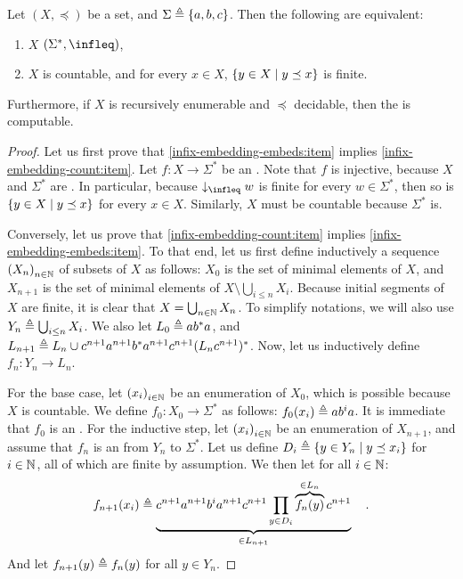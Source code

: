 \begin{theorem}
    \label{infix-embedding:thm}
    Let $(X, \preceq)$ be a  set,
    and $\Sigma \triangleq \{ a,b,c \}$.
    Then the following are equivalent:
    \begin{enumerate}
        \item \label{infix-embedding-embeds:item} 
            $X$  $(\Sigma^*, \infleq)$,
        \item \label{infix-embedding-count:item}
            $X$ is countable, and for every $x \in X$,
        $\{ y \in X \mid y \preceq x \}$ is finite.
    \end{enumerate}
    Furthermore, if $X$ is recursively enumerable and $\preceq$ decidable,
    then
    the  is computable.
\end{theorem}
\begin{proof}
    Let us first prove that \cref{infix-embedding-embeds:item} implies
    \cref{infix-embedding-count:item}. Let $f \colon X \to \Sigma^*$ be an
    . Note that $f$ is injective, because $X$ and $\Sigma^*$
    are . In particular, because $\dwset[\infleq]{w}$ is finite
    for every $w \in \Sigma^*$, then so is $\{ y \in X \mid y \preceq x \}$
    for every $x \in X$. Similarly, $X$ must be countable
    because $\Sigma^*$ is.

    Conversely, let us prove that \cref{infix-embedding-count:item} implies
    \cref{infix-embedding-embeds:item}. To that end, let us first define
    inductively a sequence $\seqof{X_n}$ of subsets of $X$ as follows: $X_0$ is
    the set of minimal elements of $X$, and $X_{n+1}$ is the set of minimal
    elements of $X \setminus \bigcup_{i \leq n} X_i$. Because initial segments
    of $X$ are finite, it is clear that $X = \bigcup_{n \in \mathbb{N}} X_n$. To
    simplify notations, we will also use $Y_n \triangleq \bigcup_{i \leq n} X_i$.
    We also let $L_0 \triangleq a b^* a$, and 
    $L_{n+1} \triangleq L_n \cup c^{n+1} a^{n+1} b^* a^{n+1} c^{n+1} (L_n c^{n+1})^*$.
    Now, let us inductively define  $f_n \colon Y_n \to
    L_n$.

    For the base case, let $\seqof{x_i}[i \in \Nat]$ be an enumeration of
    $X_0$, which is possible because $X$ is countable. We define $f_0 \colon
    X_0 \to \Sigma^*$ as follows: $f_0(x_i) \triangleq a b^i a$. It is immediate
    that $f_0$ is an . For the inductive step, let $\seqof{x_i}[i
    \in \Nat]$ be an enumeration of $X_{n+1}$, and assume that $f_n$ is an
     from $Y_n$ to $\Sigma^*$.
    Let us define $D_i \triangleq \{  y \in Y_n  \mid  y \preceq x_i  \}$
    for $i \in \mathbb{N}$, all of which are finite by assumption.
    We then let for all $i \in \mathbb{N}$:
    \begin{equation*}
        f_{n+1}(x_i) \triangleq 
        \underbrace{c^{n+1} a^{n+1} b^i a^{n+1} c^{n+1} \prod_{y \in D_i} \overbrace{f_n(y)}^{\in L_n} c^{n+1}}_{\in L_{n+1}}
        \quad .
    \end{equation*}
    And let $f_{n+1}(y) \triangleq f_n(y)$ for all $y \in Y_n$.


\end{proof}
